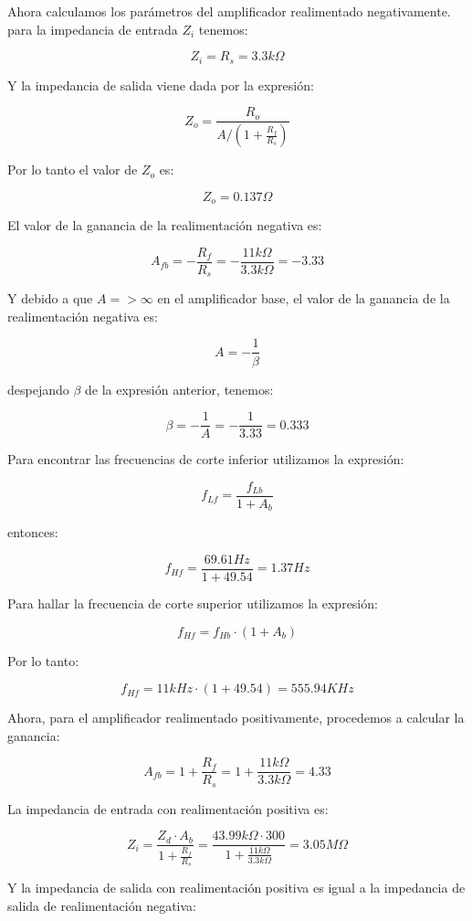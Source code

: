 \documentclass{article}
\begin{document}
Ahora calculamos los parámetros del amplificador realimentado negativamente.\\

para la impedancia de entrada $Z_i$ tenemos:

$$Z_i = R_s = 3.3 k\Omega$$

Y la impedancia de salida viene dada por la expresión:

$$Z_o = \frac{R_o}{A / (1 + \frac{R_f}{R_s})}$$

Por lo tanto el valor de $Z_o$ es:

$$Z_o = 0.137 \Omega$$

El valor de la ganancia de la realimentación negativa es: 

$$A_{fb} = - \frac{R_f}{R_s} = - \frac{11k\Omega}{3.3k\Omega} = -3.33$$

Y debido a que $A => \infty$ en el amplificador base, el valor de la ganancia de la realimentación negativa es:

$$A = -\frac{1}{\beta}$$

despejando $\beta$ de la expresión anterior, tenemos:

$$\beta = -\frac{1}{A} = -\frac{1}{3.33} = 0.333$$

Para encontrar las frecuencias de corte inferior utilizamos la expresión:

$$f_{Lf} = \frac{f_{Lb}}{1 + A_{b}}$$

entonces:

$$f_{Hf} = \frac{69.61 Hz}{1 + 49.54} = 1.37 Hz$$

Para hallar la frecuencia de corte superior utilizamos la expresión:

$$f_{Hf} = f_{Hb}\cdot (1 + A_{b})$$

Por lo tanto:

$$f_{Hf} = 11kHz\cdot (1 + 49.54) = 555.94KHz$$

Ahora, para el amplificador realimentado positivamente, procedemos a calcular la ganancia:

$$A_{fb} = 1 + \frac{R_f}{R_s} = 1 + \frac{11k\Omega}{3.3k\Omega} = 4.33$$

La impedancia de entrada con realimentación positiva es:

$$ Z_i = \frac{Z_d \cdot A_b}{1 + \frac{R_f}{R_s}} = \frac{43.99k\Omega \cdot 300}{1 + \frac{11k\Omega}{3.3k\Omega}} = 3.05M\Omega$$

Y la impedancia de salida con realimentación positiva es igual a la impedancia de salida de realimentación negativa:
\end{document}
